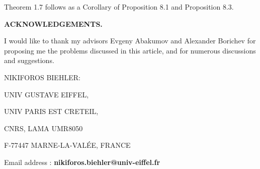 \documentclass{amsart}[11pt]
\renewcommand{\bf}[1]{\textbf{#1}}
\theoremstyle{definition}
\begin{document}
Theorem 1.7 follows as a Corollary of Proposition 8.1 and Proposition 8.3.













\vspace{5mm}

\begin{scriptsize}
\noindent \bf{ACKNOWLEDGEMENTS.} 
\end{scriptsize}
I would like to thank my advisors Evgeny Abakumov and Alexander Borichev for proposing me the problems discussed in this article, and for numerous discussions and suggestions.


%
%

\printbibliography[heading=bibintoc,title={References}] 



%
%

\vspace{8mm}


NIKIFOROS BIEHLER: 

UNIV GUSTAVE EIFFEL,

UNIV PARIS EST CRETEIL, 

CNRS, LAMA UMR8050 

F-77447 MARNE-LA-VALÉE, FRANCE
 
 Email address : \bf{nikiforos.biehler@univ-eiffel.fr}
\end{document}
